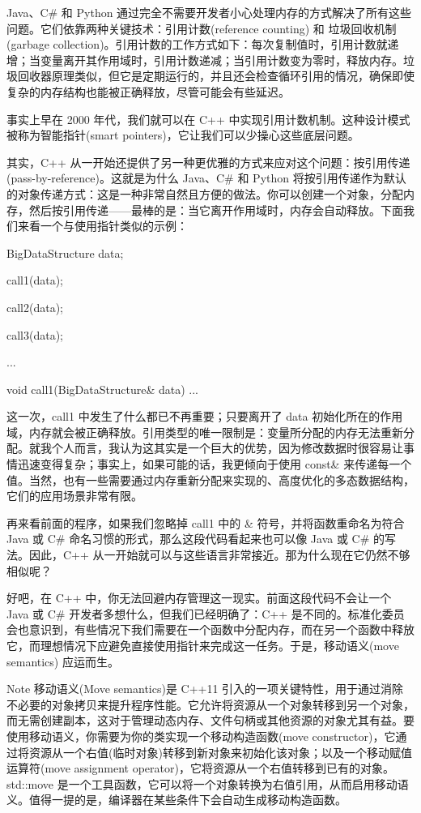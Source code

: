 Java、C\# 和 Python 通过完全不需要开发者小心处理内存的方式解决了所有这些问题。它们依靠两种关键技术：引用计数(reference counting) 和 垃圾回收机制(garbage collection)。引用计数的工作方式如下：每次复制值时，引用计数就递增；当变量离开其作用域时，引用计数递减；当引用计数变为零时，释放内存。垃圾回收器原理类似，但它是定期运行的，并且还会检查循环引用的情况，确保即使复杂的内存结构也能被正确释放，尽管可能会有些延迟。

事实上早在 2000 年代，我们就可以在 C++ 中实现引用计数机制。这种设计模式被称为智能指针(smart pointers)，它让我们可以少操心这些底层问题。

其实，C++ 从一开始还提供了另一种更优雅的方式来应对这个问题：按引用传递(pass-by-reference)。这就是为什么 Java、C\# 和 Python 将按引用传递作为默认的对象传递方式：这是一种非常自然且方便的做法。你可以创建一个对象，分配内存，然后按引用传递——最棒的是：当它离开作用域时，内存会自动释放。下面我们来看一个与使用指针类似的示例：


\begin{cpp}
BigDataStructure data{};

call1(data);

call2(data);

call3(data);

...

void call1(BigDataStructure& data){
  ...
}
\end{cpp}

这一次，call1 中发生了什么都已不再重要；只要离开了 data 初始化所在的作用域，内存就会被正确释放。引用类型的唯一限制是：变量所分配的内存无法重新分配。就我个人而言，我认为这其实是一个巨大的优势，因为修改数据时很容易让事情迅速变得复杂；事实上，如果可能的话，我更倾向于使用 const\& 来传递每一个值。当然，也有一些需要通过内存重新分配来实现的、高度优化的多态数据结构，它们的应用场景非常有限。

再来看前面的程序，如果我们忽略掉 call1 中的 \& 符号，并将函数重命名为符合 Java 或 C\# 命名习惯的形式，那么这段代码看起来也可以像 Java 或 C\# 的写法。因此，C++ 从一开始就可以与这些语言非常接近。那为什么现在它仍然不够相似呢？

好吧，在 C++ 中，你无法回避内存管理这一现实。前面这段代码不会让一个 Java 或 C\# 开发者多想什么，但我们已经明确了：C++ 是不同的。标准化委员会也意识到，有些情况下我们需要在一个函数中分配内存，而在另一个函数中释放它，而理想情况下应避免直接使用指针来完成这一任务。于是，移动语义(move semantics) 应运而生。

\begin{myNotic}{Note}
移动语义(Move semantics)是 C++11 引入的一项关键特性，用于通过消除不必要的对象拷贝来提升程序性能。它允许将资源从一个对象转移到另一个对象，而无需创建副本，这对于管理动态内存、文件句柄或其他资源的对象尤其有益。要使用移动语义，你需要为你的类实现一个移动构造函数(move constructor)，它通过将资源从一个右值(临时对象)转移到新对象来初始化该对象；以及一个移动赋值运算符(move assignment operator)，它将资源从一个右值转移到已有的对象。std::move 是一个工具函数，它可以将一个对象转换为右值引用，从而启用移动语义。值得一提的是，编译器在某些条件下会自动生成移动构造函数。
\end{myNotic}


